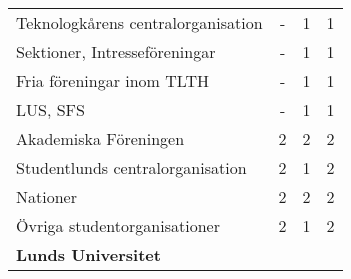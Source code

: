 \documentclass{dsekprotokoll}
\begin{document}
\begin{table}[hbp!]
\begin{tabular}{@{}lccc@{}}
        \addlinespace
        \cmidrule{1-1}
        Teknologkårens centralorganisation & -                             & 1                                                                                             & 1                                                                                 \\
        Sektioner, Intresseföreningar      & -                             & 1                                                                                             & 1                                                                                 \\
        Fria föreningar inom TLTH          & -                             & 1                                                                                             & 1                                                                                 \\
        LUS, SFS                           & -                             & 1                                                                                             & 1                                                                                 \\
        Akademiska Föreningen              & 2                             & 2                                                                                             & 2                                                                                 \\
        Studentlunds centralorganisation   & 2                             & 1                                                                                             & 2                                                                                 \\
        Nationer                           & 2                             & 2                                                                                             & 2                                                                                 \\
        Övriga studentorganisationer       & 2                             & 1                                                                                             & 2                                                                                 \\
        \addlinespace
        \midrule
        \addlinespace
        \textbf{Lunds Universitet}         &                               &                                                                                               &                                                                                   \\

\end{tabular}
\end{table}
\end{document}
